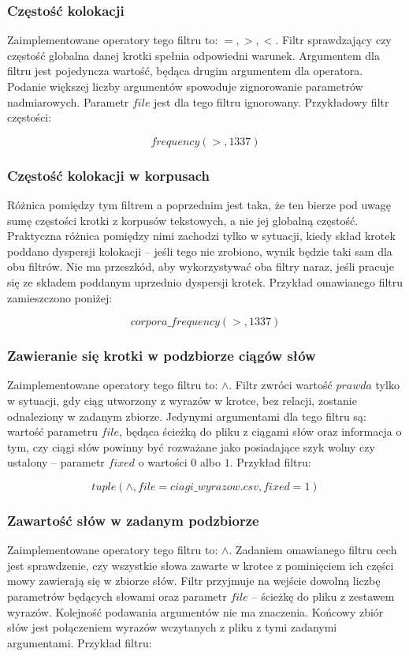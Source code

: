 \subsubsection{Częstość kolokacji}
Zaimplementowane operatory tego filtru to: $ =, >, < $.
Filtr sprawdzający czy częstość globalna danej krotki spełnia odpowiedni warunek.
Argumentem dla filtru jest pojedyncza wartość, będąca drugim argumentem dla operatora.
Podanie większej liczby argumentów spowoduje zignorowanie parametrów nadmiarowych.
Parametr $ file $ jest dla tego filtru ignorowany.
Przykładowy filtr częstości:

$$ frequency(>,1337) $$

\subsubsection{Częstość kolokacji w korpusach}
Różnica pomiędzy tym filtrem a poprzednim jest taka, że ten bierze pod uwagę sumę częstości krotki z korpusów tekstowych, a nie jej globalną częstość.
Praktyczna różnica pomiędzy nimi zachodzi tylko w sytuacji, kiedy skład krotek poddano dyspersji kolokacji -- jeśli tego nie zrobiono, wynik będzie taki sam dla obu filtrów.
Nie ma przeszkód, aby wykorzystywać oba filtry naraz, jeśli pracuje się ze składem poddanym uprzednio dyspersji krotek.
Przykład omawianego filtru zamieszczono poniżej:

$$ corpora\_frequency(>,1337) $$

\subsubsection{Zawieranie się krotki w podzbiorze ciągów słów}
Zaimplementowane operatory tego filtru to: $ \wedge $.
Filtr zwróci wartość $ prawda $ tylko w sytuacji, gdy ciąg utworzony z wyrazów w krotce, bez relacji, zostanie odnaleziony w zadanym zbiorze.
Jedynymi argumentami dla tego filtru są: wartość parametru $ file $, będąca ścieżką do pliku z ciągami słów oraz informacja o tym, czy ciągi słów powinny być rozważane jako posiadające szyk wolny czy ustalony -- parametr $ fixed $ o wartości $ 0 $ albo $ 1 $.
Przykład filtru:

$$ tuple(\wedge,file=ciagi\_wyrazow.csv,fixed=1) $$

\subsubsection{Zawartość słów w zadanym podzbiorze}
Zaimplementowane operatory tego filtru to: $ \wedge $.
Zadaniem omawianego filtru cech jest sprawdzenie, czy wszystkie słowa zawarte w krotce z pominięciem ich części mowy zawierają się w zbiorze słów.
Filtr przyjmuje na wejście dowolną liczbę parametrów będących słowami oraz parametr $ file $ -- ścieżkę do pliku z zestawem wyrazów.
Kolejność podawania argumentów nie ma znaczenia.
Końcowy zbiór słów jest połączeniem wyrazów wczytanych z pliku z tymi zadanymi argumentami.
Przykład filtru:

